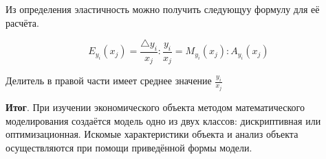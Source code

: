 \documentclass[12pt,a4paper]{article}
\begin{document}
Из определения эластичность можно получить следующуу формулу для её расчёта.

$$E_{y_i}(x_j) = \frac{\triangle y_i}{x_j} : \frac{y_i}{x_j} = M_{y_i}(x_j) : A_{y_i}(x_j)$$

Делитель в правой части имеет среднее значение $\displaystyle{\frac{y_i}{x_j}}$

\textbf{Итог}. При изучении экономического объекта методом математического моделирования создаётся модель одно из двух классов: дискриптивная или оптимизационная. Искомые характеристики объекта и анализ объекта осуществляются при помощи приведённой формы модели.
\end{document}
